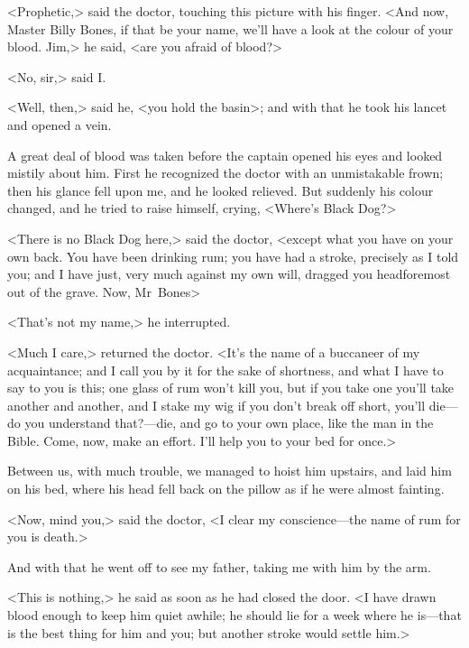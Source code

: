 <Prophetic,> said the doctor, touching this picture with his finger. <And now, Master Billy Bones, if that be your name, we'll have a look at the colour of your blood. Jim,> he said, <are you afraid of blood?>

<No, sir,> said I\@.

<Well, then,> said he, <you hold the basin>; and with that he took his lancet and opened a vein.

A great deal of blood was taken before the captain opened his eyes and looked mistily about him. First he recognized the doctor with an unmistakable frown; then his glance fell upon me, and he looked relieved. But suddenly his colour changed, and he tried to raise himself, crying, <Where's Black Dog?>

<There is no Black Dog here,> said the doctor, <except what you have on your own back. You have been drinking rum; you have had a stroke, precisely as I told you; and I have just, very much against my own will, dragged you headforemost out of the grave. Now, Mr~Bones\longdash>

<That's not my name,> he interrupted.

<Much I care,> returned the doctor. <It's the name of a buccaneer of my acquaintance; and I call you by it for the sake of shortness, and what I have to say to you is this; one glass of rum won't kill you, but if you take one you'll take another and another, and I stake my wig if you don't break off short, you'll die—do you understand that?—die, and go to your own place, like the man in the Bible. Come, now, make an effort. I'll help you to your bed for once.>

Between us, with much trouble, we managed to hoist him upstairs, and laid him on his bed, where his head fell back on the pillow as if he were almost fainting.

<Now, mind you,> said the doctor, <I clear my conscience—the name of rum for you is death.>

And with that he went off to see my father, taking me with him by the arm.

<This is nothing,> he said as soon as he had closed the door. <I have drawn blood enough to keep him quiet awhile; he should lie for a week where he is—that is the best thing for him and you; but another stroke would settle him.>